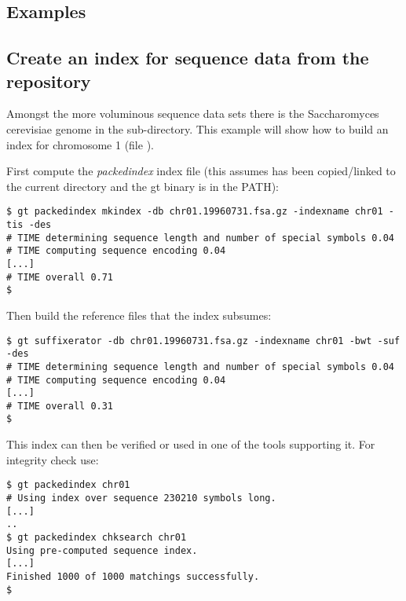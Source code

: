 \documentclass[12pt,titlepage]{article}
\newcommand{\packedindex}{\textit{packedindex}\xspace}
\newcommand{\species}[1]{{\fontshape{it}\selectfont #1}}%
\begin{document}
\subsection{Examples}
\label{sec:packedindex:examples}

\subsection{Create an index for sequence data from the
   repository\cite{gttestdata}}
\label{sec:packedindex:examples:yeast}

Amongst the more voluminous sequence data sets there is the
\species{Saccharomyces cerevisiae} genome in the
 sub-directory. This example will show how
to build an index for chromosome 1 (file
).

First compute the \packedindex index file (this assumes
 has been copied/linked to the current
directory and the gt binary is in the PATH):
\begin{footnotesize}
\begin{verbatim}
$ gt packedindex mkindex -db chr01.19960731.fsa.gz -indexname chr01 -tis -des
# TIME determining sequence length and number of special symbols 0.04
# TIME computing sequence encoding 0.04
[...]
# TIME overall 0.71
$
\end{verbatim}
\end{footnotesize}

Then build the reference files that the index subsumes:
\begin{footnotesize}
\begin{verbatim}
$ gt suffixerator -db chr01.19960731.fsa.gz -indexname chr01 -bwt -suf -des
# TIME determining sequence length and number of special symbols 0.04
# TIME computing sequence encoding 0.04
[...]
# TIME overall 0.31
$
\end{verbatim}
\end{footnotesize}

This index can then be verified or used in one of the tools supporting
it. For integrity check use:
\begin{footnotesize}
\begin{verbatim}
$ gt packedindex chr01
# Using index over sequence 230210 symbols long.
[...]
..
$ gt packedindex chksearch chr01
Using pre-computed sequence index.
[...]
Finished 1000 of 1000 matchings successfully.
$
\end{verbatim}
\end{footnotesize}
\end{document}
